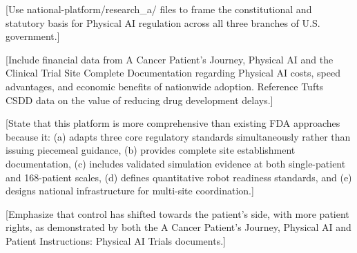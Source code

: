 [Use national-platform/research\_a/ files to frame the constitutional and
statutory basis for Physical AI regulation across all three branches of U.S.
government.]

[Include financial data from A Cancer Patient's Journey, Physical AI
\cite{patient-journey-paper} and the Clinical Trial Site Complete Documentation
\cite{site-docs} regarding Physical AI costs, speed advantages, and economic
benefits of nationwide adoption. Reference Tufts CSDD data \cite{tufts-delay}
on the value of reducing drug development delays.]

[State that this platform is more comprehensive than existing FDA approaches
because it: (a) adapts three core regulatory standards simultaneously rather
than issuing piecemeal guidance, (b) provides complete site establishment
documentation, (c) includes validated simulation evidence at both single-patient
and 168-patient scales, (d) defines quantitative robot readiness standards, and
(e) designs national infrastructure for multi-site coordination.]

[Emphasize that control has shifted towards the patient's side, with more
patient rights, as demonstrated by both the A Cancer Patient's Journey,
Physical AI and Patient Instructions: Physical AI Trials documents.]
